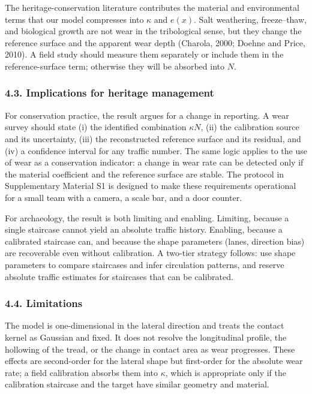 \documentclass[
]{article}
\begin{document}
The heritage-conservation literature contributes the material and
environmental terms that our model compresses into \(\kappa\) and
\(e(x)\). Salt weathering, freeze--thaw, and biological growth are not
wear in the tribological sense, but they change the reference surface
and the apparent wear depth (Charola, 2000; Doehne and Price, 2010). A
field study should measure them separately or include them in the
reference-surface term; otherwise they will be absorbed into \(N\).

\subsubsection{4.3. Implications for heritage
management}\label{implications-for-heritage-management}

For conservation practice, the result argues for a change in reporting.
A wear survey should state (i) the identified combination \(\kappa N\),
(ii) the calibration source and its uncertainty, (iii) the reconstructed
reference surface and its residual, and (iv) a confidence interval for
any traffic number. The same logic applies to the use of wear as a
conservation indicator: a change in wear rate can be detected only if
the material coefficient and the reference surface are stable. The
protocol in Supplementary Material S1 is designed to make these
requirements operational for a small team with a camera, a scale bar,
and a door counter.

For archaeology, the result is both limiting and enabling. Limiting,
because a single staircase cannot yield an absolute traffic history.
Enabling, because a calibrated staircase can, and because the shape
parameters (lanes, direction bias) are recoverable even without
calibration. A two-tier strategy follows: use shape parameters to
compare staircases and infer circulation patterns, and reserve absolute
traffic estimates for staircases that can be calibrated.

\subsubsection{4.4. Limitations}\label{limitations}

The model is one-dimensional in the lateral direction and treats the
contact kernel as Gaussian and fixed. It does not resolve the
longitudinal profile, the hollowing of the tread, or the change in
contact area as wear progresses. These effects are second-order for the
lateral shape but first-order for the absolute wear rate; a field
calibration absorbs them into \(\kappa\), which is appropriate only if
the calibration staircase and the target have similar geometry and
material.
\end{document}
